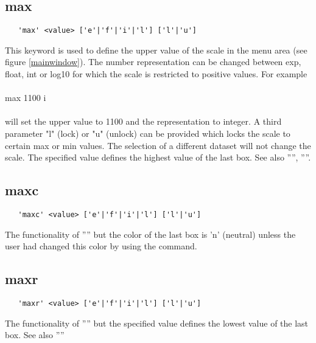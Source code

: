 \documentclass{article}
\begin{document}
\subsection{\label{max}max}
\begin{verbatim}
   'max' <value> ['e'|'f'|'i'|'l'] ['l'|'u']
\end{verbatim}
This keyword is used to define the upper value of the scale in the menu area (see figure \ref{mainwindow}). The number representation can be changed between exp, float, int or log10 for which the scale is restricted to positive values. For example\\\\max 1100 i\\\\will set the upper value to 1100 and the representation to integer. A third parameter "l" (lock) or "u" (unlock) can be provided which locks the scale to certain max or min values. The selection of a different dataset will not change the scale. The specified value defines the highest value of the last box. See also '''', ''''.
 
\subsection{\label{maxc}maxc}
\begin{verbatim}
   'maxc' <value> ['e'|'f'|'i'|'l'] ['l'|'u']
\end{verbatim}
The functionality of '''' but the color of the last box is 'n' (neutral) unless the user had changed this color by using the  command.
 
\subsection{\label{maxr}maxr}
\begin{verbatim}
   'maxr' <value> ['e'|'f'|'i'|'l'] ['l'|'u']
\end{verbatim}
The functionality of '''' but the specified value defines the lowest value of the last box. See also ''''
\end{document}

